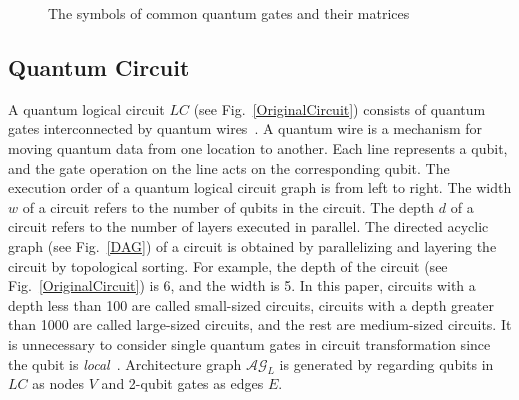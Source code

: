 \documentclass[runningheads]{llncs}
\begin{document}
{\begin{figure}
\begin{center}
\end{center}

\caption{The symbols of common quantum gates and their matrices}\label{common_gates}
\end{figure}	 

}

\subsection{Quantum Circuit}
A quantum logical circuit $LC$ (see Fig.~\ref{OriginalCircuit})
consists of quantum gates interconnected by quantum wires~\cite{Daei2020}.
A quantum wire is a mechanism for moving quantum data from one location to another.
Each line represents a qubit, and the gate operation on the line acts on the corresponding qubit.
The execution order of a quantum logical circuit graph is from left to right.
The width $w$ of a circuit refers to the number of qubits in the circuit.
The depth $d$ of a circuit refers to the number of layers executed in parallel.
The directed acyclic graph (see Fig.~\ref{DAG}) of a circuit is obtained by parallelizing and layering the circuit by topological sorting.
For example, the depth of the circuit (see Fig.~\ref{OriginalCircuit}) is 6, and the width is 5.
In this paper, circuits with a depth less than 100 are called small-sized circuits,
circuits with a depth greater than 1000 are called large-sized circuits,
and the rest are medium-sized circuits.
It is unnecessary to consider single quantum gates in circuit transformation since the qubit is \emph{local}~\cite{2013Optimization}.
Architecture graph $\mathcal{AG}_{L}$ is generated by regarding qubits in $LC$ as nodes $V$ and 2-qubit gates as edges $E$.
\end{document}
